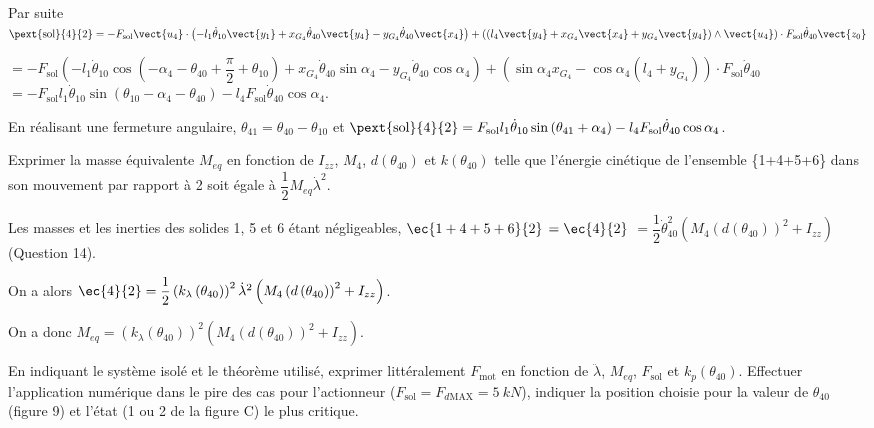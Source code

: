 \documentclass[11pt]{article}
\begin{document}
\begin{UPSTIcorrige}
Par suite $
\pext{\text{sol}}{4}{2} =-F_{\text{sol}}\vect{u_4} \cdot \left( -l_1\dot{\theta}_{10} \vect{y_1} +  x_{G_4} \dot{\theta}_{40} \vect{y_4}- y_{G_4} \dot{\theta}_{40} \vect{x_4}\right) + \left(\left( l_4 \vect{y_4} +  x_{G_4} \vect{x_4}+ y_{G_4} \vect{y_4}\right)\wedge \vect{u_4}  \right)\cdot F_{\text{sol}} \dot{\theta}_{40}\vect{z_0}$

$=-F_{\text{sol}} \left( -l_1\dot{\theta}_{10}\cos\left( -\alpha_4 - \theta_{40} +\dfrac{\pi}{2} + \theta_{10}\right) +  x_{G_4} \dot{\theta}_{40}\sin \alpha_4- y_{G_4} \dot{\theta}_{40}\cos\alpha_4\right)  + \left( \sin \alpha_4 x_{G_4} - \cos \alpha_4 \left( l_4 + y_{G_4}\right) \right)\cdot F_{\text{sol}} \dot{\theta}_{40}$
$=-F_{\text{sol}} l_1\dot{\theta}_{10}\sin\left(  \theta_{10}-\alpha_4 - \theta_{40}\right)     - l_4  F_{\text{sol}} \dot{\theta}_{40} \cos \alpha_4 $. 

En réalisant une fermeture angulaire, $\theta_{41} = \theta_{40} -\theta_{10}$ et
$\pext{\text{sol}}{4}{2}=F_{\text{sol}} l_1\dot{\theta}_{10}\sin\left(  \theta_{41}+\alpha_4 \right)     - l_4  F_{\text{sol}} \dot{\theta}_{40} \cos \alpha_4 $. 



\end{UPSTIcorrige}



\UPSTIquestion Exprimer la masse équivalente $M_{eq}$ en fonction de $I_{zz}$, $M_4$, $d\left(\theta_{40}\right)$ et $k\left(\theta_{40}\right)$ telle que l’énergie cinétique de l’ensemble \{1+4+5+6\} dans son mouvement par rapport à 2 soit égale à $\dfrac{1}{2}M_{eq} \dot{\lambda}^2$.

\begin{UPSTIcorrige}
Les masses et les inerties des solides 1, 5 et 6 étant négligeables, $  \ec{1+4+5+6}{2}$ $=\ec{4}{2}$ $= \dfrac{1}{2}  \dot{\theta}_{40}^2 \left(M_4   \left(d\left( \theta_{40}\right) \right)^2 +  I_{zz} \right)$ (Question 14). 

On a alors  $\ec{4}{2}= \dfrac{1}{2} \left( k_{\lambda} \left(\theta_{40}\right)\right) ^2\dot{\lambda}^2 \left(M_4   \left(d\left( \theta_{40}\right) \right)^2 +  I_{zz} \right)$.

On a donc $M_{eq}=  \left( k_{\lambda} \left(\theta_{40}\right)\right) ^2 \left(M_4   \left(d\left( \theta_{40}\right) \right)^2 +  I_{zz} \right)$.
\end{UPSTIcorrige}



\UPSTIquestion  En indiquant le système isolé et le théorème utilisé, exprimer littéralement $F_{\text{mot}}$ en fonction de $\ddot{\lambda}$, $M_{eq}$, $F_{\text{sol}}$ et $k_p\left(\theta_{40}\right)$. Effectuer l’application numérique dans le pire des cas pour l’actionneur ($F_{\text{sol}} = F_{d \text{MAX}}=\SI{5}{kN}$),
indiquer la position choisie pour la valeur de $\theta_{40}$ (figure 9) et l’état (1 ou 2 de la figure C) le plus critique.
\end{document}
